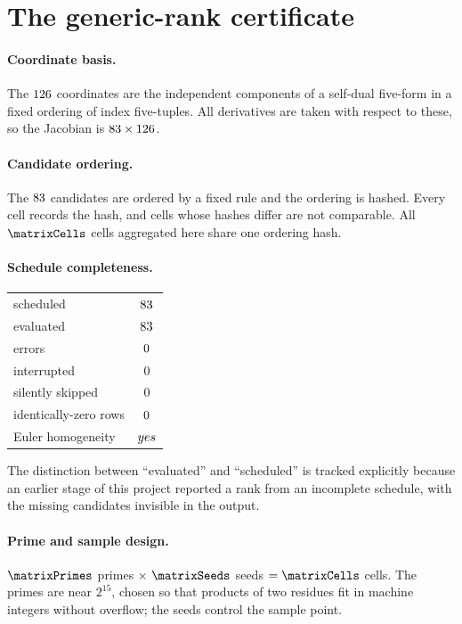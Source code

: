 \section{The generic-rank certificate}
\label{app:rank81}

\paragraph{Coordinate basis.}
The $126$ coordinates are the independent components of a
self-dual five-form in a fixed ordering of index five-tuples. All derivatives are
taken with respect to these, so the Jacobian is
$83 \times 126$.

\paragraph{Candidate ordering.}
The $83$ candidates are ordered by a fixed rule and the ordering
is hashed. Every cell records the hash, and cells whose hashes differ are not
comparable. All $\matrixCells$ cells aggregated here share one ordering hash.

\paragraph{Schedule completeness.}
\begin{center}
\begin{tabular}{lc}
\hline
scheduled & $83$ \\
evaluated & $83$ \\
errors & $0$ \\
interrupted & $0$ \\
silently skipped & $0$ \\
identically-zero rows & $0$ \\
Euler homogeneity & $yes$ \\
\hline
\end{tabular}
\end{center}
The distinction between ``evaluated'' and ``scheduled'' is tracked explicitly
because an earlier stage of this project reported a rank from an incomplete
schedule, with the missing candidates invisible in the output.

\paragraph{Prime and sample design.}
$\matrixPrimes$ primes $\times$ $\matrixSeeds$ seeds $= \matrixCells$ cells. The
primes are near $2^{15}$, chosen so that products of two residues fit in machine
integers without overflow; the seeds control the sample point.

